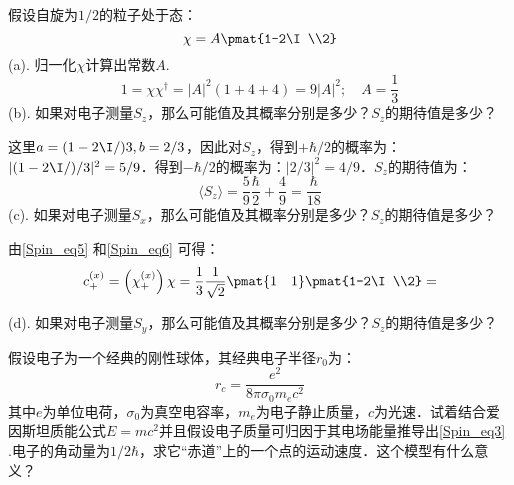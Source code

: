 \begin{example}{}
假设自旋为$1/2$的粒子处于态：
\begin{equation}
\chi = A\pmat{1-2\I\\2}
\end{equation}
(a). 归一化$\chi$计算出常数$A$.
\begin{equation}
1=\chi\chi^\dagger=|A|^2(1+4+4)=9|A|^2;\quad A=\frac{1}{3}
\end{equation}
(b). 如果对电子测量$S_z$，那么可能值及其概率分别是多少？$S_z$的期待值是多少？

这里$a=(1-2\I/)3,b=2/3$，因此对$S_z$，得到$+\hbar/2$的概率为：$|(1-2\I/)/3|^2=5/9$．得到$-\hbar/2$的概率为：$|2/3|^2=4/9$．$S_z$的期待值为：
\begin{equation}
\langle S_z \rangle =\frac{5}{9}\frac{\hbar}{2}+\frac{4}{9}=\frac{\hbar}{18}
\end{equation}
(c). 如果对电子测量$S_x$，那么可能值及其概率分别是多少？$S_z$的期待值是多少？

由\autoref{Spin_eq5} 和\autoref{Spin_eq6} 可得：
\begin{equation}
c_+^{(x)}=\left(\chi_+^{(x)}\right)\chi=\frac{1}{3}\frac{1}{\sqrt{2}}\pmat{1\quad 1}\pmat{1-2\I\\2}=
\end{equation}

(d). 如果对电子测量$S_y$，那么可能值及其概率分别是多少？$S_z$的期待值是多少？
\end{example}


\begin{exercise}{}
假设电子为一个经典的刚性球体，其经典电子半径$r_0$为：
\begin{equation}\label{Spin_eq3}
r_c=\frac{e^2}{8\pi\sigma_0m_e c^2}
\end{equation}
其中$e$为单位电荷，$\sigma_0$为真空电容率，$m_e$为电子静止质量，$c$为光速．试着结合爱因斯坦质能公式$E=mc^2$并且假设电子质量可归因于其电场能量推导出\autoref{Spin_eq3} .电子的角动量为$1/2\hbar$，求它“赤道”上的一个点的运动速度．这个模型有什么意义？
\end{exercise}